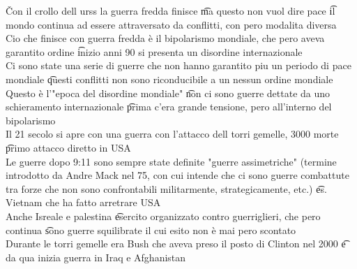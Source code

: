 \documentclass[12pt]{article}
\begin{document}
\v

Con il crollo dell urss la guerra fredda finisce \t ma questo non vuol dire pace \t il mondo continua ad essere attraversato da conflitti, con pero modalita diversa \\
Cio che finisce con guerra fredda è il bipolarismo mondiale, che pero aveva garantito ordine \t inizio anni 90 si presenta un disordine internazionale \\
Ci sono state una serie di guerre che non hanno garantito piu un periodo di pace mondiale \t questi conflitti non sono riconducibile a un nessun ordine mondiale \\
Questo è l'"epoca del disordine mondiale" \t non ci sono guerre dettate da uno schieramento internazionale \t prima c'era grande tensione, pero all'interno del bipolarismo \\
Il 21 secolo si apre con una guerra con l'attacco dell torri gemelle, 3000 morte \t primo attacco diretto in USA \\
Le guerre dopo 9:11 sono sempre state definite "guerre assimetriche" (termine introdotto da Andre Mack nel 75, con cui intende che ci sono guerre combattute tra forze che non sono confrontabili militarmente, strategicamente, etc.) \t es. Vietnam che ha fatto arretrare USA \\
Anche Isreale e palestina \t esercito organizzato contro guerriglieri, che pero continua \t sono guerre squilibrate il cui esito non è mai pero scontato \\
Durante le torri gemelle era Bush che aveva preso il posto di Clinton nel 2000 \t e da qua inizia guerra in Iraq e Afghanistan
\end{document}
